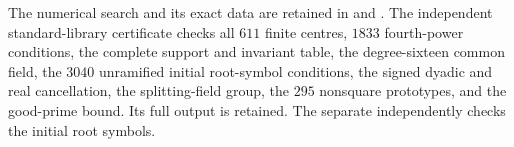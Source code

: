 The numerical search and its exact data are retained in
 and
.
The independent standard-library certificate
checks all $611$ finite centres, $1833$ fourth-power
conditions, the complete support and invariant table,
the degree-sixteen common field, the $3040$ unramified
initial root-symbol conditions, the signed dyadic
and real cancellation, the splitting-field group,
the $295$ nonsquare prototypes, and the good-prime
bound.
Its full output is retained.
The separate
independently checks the initial root symbols.
